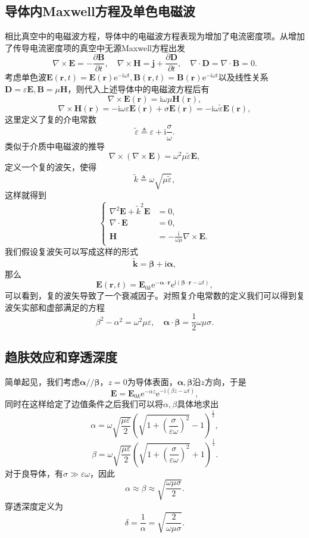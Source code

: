 \documentclass[UTF8]{ctexbook}
\newcommand{\e}{\mathrm{e}}
\renewcommand{\b}{\boldsymbol}
\renewcommand{\i}{\mathrm{i}}
\numberwithin{equation}{chapter}
\begin{document}
	\subsection{导体内Maxwell方程及单色电磁波}
	相比真空中的电磁波方程，导体中的电磁波方程表现为增加了电流密度项。从增加了传导电流密度项的真空中无源Maxwell方程出发
	\[\nabla\times\b{E}=-\frac{\partial \b{B}}{\partial t},\quad \nabla\times\b{H}=\b{j}+\frac{\partial \b{D}}{\partial t},\quad \nabla\cdot\b{D}=\nabla\cdot\b{B}=0.\]
	考虑单色波$\b{E}(\b{r},t)=\b{E}(\b{r})\e^{-\i\omega t},\b{B}(\b{r},t)=\b{B}(\b{r})\e^{-\i\omega t}$以及线性关系$\b{D}=\varepsilon\b{E},\b{B}=\mu\b{H}$，则代入上述导体中的电磁波方程后有
	\[\nabla\times\b{E}(\b{r})=\i\omega\mu\b{H}(\b{r}),\]
	\[\nabla\times\b{H}(\b{r})=-\i\omega\varepsilon\b{E}(\b{r})+\sigma\b{E}(\b{r})=-\i\omega\tilde{\varepsilon}\b{E}(\b{r}),\]
	这里定义了复的介电常数
	\[\tilde{\varepsilon}\triangleq\varepsilon+\i\frac{\sigma}{\omega}.\]
	类似于介质中电磁波的推导
	\[\nabla\times(\nabla\times\b{E})=\omega^2\mu\tilde{\varepsilon}\b{E},\]
	定义一个复的波矢，使得
	\[\tilde{k}\triangleq\omega\sqrt{\mu\tilde{\varepsilon}},\]
	这样就得到
	\[\left\{\begin{aligned}
		\nabla^2\b{E}+\tilde{k}^2\b{E}&=0,\\
		\nabla\cdot\b{E}&=0,\\
		\b{H}&=-\frac{\i}{\omega\mu}\nabla\times\b{E}.
	\end{aligned}\right.\]
	我们假设复波矢可以写成这样的形式
	\[\tilde{\b{k}}=\b{\beta}+\i\b{\alpha},\]
	那么
	\[\b{E}(\b{r},t)=\b{E}_{0k}\e^{-\b{\alpha}\cdot\b{r}}\e^{\i(\b{\beta}\cdot\b{r}-\omega t)},\]
	可以看到，复的波矢导致了一个衰减因子。对照复介电常数的定义我们可以得到复波矢实部和虚部满足的方程
	\[\beta^2-\alpha^2=\omega^2\mu\varepsilon,\quad \b{\alpha}\cdot\b{\beta}=\frac{1}{2}\omega\mu\sigma.\]
	
	\subsection{趋肤效应和穿透深度}
	简单起见，我们考虑$\b{\alpha}//\b{\beta}$，$z=0$为导体表面，$\b{\alpha},\b{\beta}$沿$z$方向，于是
	\[\b{E}=\b{E}_{0k}\e^{-\alpha z}\e^{-\i(\beta z - \omega t)},\]
	同时在这样给定了边值条件之后我们可以将$\alpha,\beta$具体地求出
	\[\alpha=\omega\sqrt{\frac{\mu\varepsilon}{2}}\left(\sqrt{1+\left(\frac{\sigma}{\varepsilon\omega}\right)^2}-1\right)^{\frac{1}{2}},\]
	\[\beta=\omega\sqrt{\frac{\mu\varepsilon}{2}}\left(\sqrt{1+\left(\frac{\sigma}{\varepsilon\omega}\right)^2}+1\right)^{\frac{1}{2}}.\]
	对于良导体，有$\sigma \gg \varepsilon \omega$，因此
	\[\alpha\approx\beta\approx \sqrt{\frac{\omega \mu\sigma}{2}}.\]
	穿透深度定义为
	\[\delta=\frac{1}{\alpha}=\sqrt{\frac{2}{\omega\mu\sigma}}.\]
	
\end{document}
